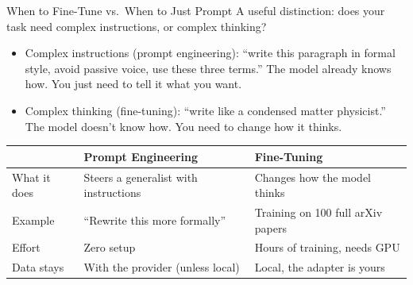 \documentclass[aspectratio=169]{beamer}
\begin{document}
\begin{frame}{When to Fine-Tune vs.\ When to Just Prompt}
    A useful distinction: does your task need complex instructions, or complex thinking?

    \begin{itemize}
        \vspace{0.3em}
        \item Complex instructions (prompt engineering): ``write this paragraph in formal style, avoid passive voice, use these three terms.'' The model already knows how. You just need to tell it what you want.
        \vspace{0.3em}
        \item Complex thinking (fine-tuning): ``write like a condensed matter physicist.'' The model doesn't know how. You need to change how it thinks.
    \end{itemize}

    \vspace{0.5em}
    \begin{table}
        \centering
        \small
        \begin{tabular}{lll}
            \toprule
            & \textbf{Prompt Engineering} & \textbf{Fine-Tuning} \\
            \midrule
            What it does & Steers a generalist with instructions & Changes how the model thinks \\
            Example & ``Rewrite this more formally'' & Training on 100 full arXiv papers \\
            Effort & Zero setup & Hours of training, needs GPU \\
            Data stays & With the provider (unless local) & Local, the adapter is yours \\
            \bottomrule
        \end{tabular}
    \end{table}
\end{frame}
\end{document}
